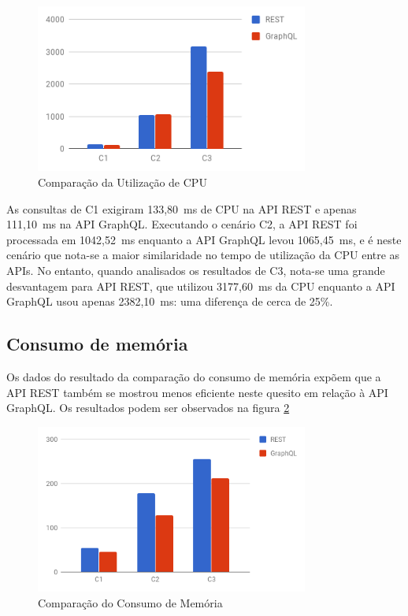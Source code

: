 \begin{figure}[htbp]
    \centering
    \includegraphics[width=0.8\textwidth]{figuras/q1-cpu.png}
    \caption{Comparação da Utilização de CPU}
    \label{fig:q1-cpu}
\end{figure}

As consultas de C1 exigiram 133,80~ms de CPU na API REST e apenas 111,10~ms na API GraphQL. Executando o cenário C2, a API REST foi processada em 1042,52~ms enquanto a API GraphQL levou 1065,45~ms, e é neste cenário que nota-se a maior similaridade no tempo de utilização da CPU entre as APIs. No entanto, quando analisados os resultados de C3, nota-se uma grande desvantagem para API REST, que utilizou 3177,60~ms da CPU enquanto a API GraphQL usou apenas 2382,10~ms: uma diferença de cerca de 25\%.
    
\subsection{Consumo de memória}

Os dados do resultado da comparação do consumo de memória expõem que a API REST também se mostrou menos eficiente neste quesito em relação à API GraphQL. Os resultados podem ser observados na figura \ref{fig:q1-mem}

\begin{figure}[htbp]
    \centering
    \includegraphics[width=0.8\textwidth]{figuras/q1-memory.png}
    \caption{Comparação do Consumo de Memória}
    \label{fig:q1-mem}
\end{figure}


